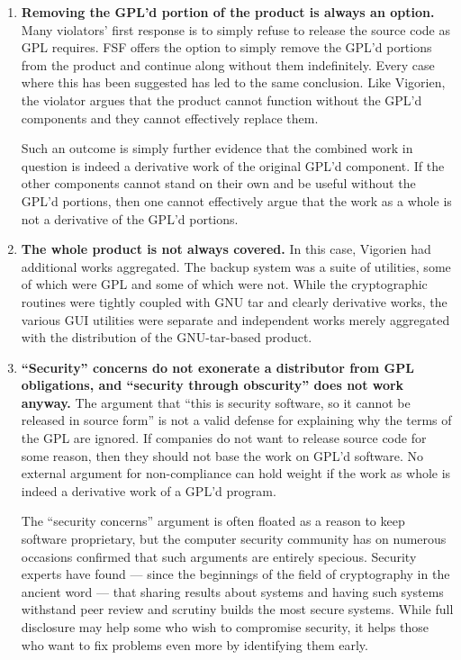 \documentclass[12pt]{report}
\begin{document}
\begin{enumerate}

\item {\bf Removing the GPL'd portion of the product is always an option.}
  Many violators' first response is to simply refuse to release the source
  code as GPL requires.  FSF offers the option to simply remove the GPL'd
  portions from the product and continue along without them indefinitely.
  Every case where this has been suggested has led to the same conclusion.
  Like Vigorien, the violator argues that the product cannot function
  without the GPL'd components and they cannot effectively replace them.

  Such an outcome is simply further evidence that the combined work in
  question is indeed a derivative work of the original GPL'd component.
  If the other components cannot stand on their own and be useful without
  the GPL'd portions, then one cannot effectively argue that the work as a
  whole is not a derivative of the GPL'd portions.

\item {\bf The whole product is not always covered.}  In this case,
  Vigorien had additional works aggregated.  The backup system was a suite
  of utilities, some of which were GPL and some of which were not.  While
  the cryptographic routines were tightly coupled with GNU tar and clearly
  derivative works, the various GUI utilities were separate and
  independent works merely aggregated with the distribution of the
  GNU-tar-based product.


\item {\bf ``Security'' concerns do not exonerate a distributor from GPL
  obligations, and ``security through obscurity'' does not work anyway.}
  The argument that ``this is security software, so it cannot be released
  in source form'' is not a valid defense for explaining why the terms of
  the GPL are ignored.  If companies do not want to release source code
  for some reason, then they should not base the work on GPL'd software.
  No external argument for non-compliance can hold weight if the work as
  whole is indeed a derivative work of a GPL'd program.

  The ``security concerns'' argument is often floated as a reason to keep
  software proprietary, but the computer security community has on
  numerous occasions confirmed that such arguments are entirely specious.
  Security experts have found --- since the beginnings of the field of
  cryptography in the ancient word --- that sharing results about systems
  and having such systems withstand peer review and scrutiny builds the
  most secure systems.  While full disclosure may help some who wish to
  compromise security, it helps those who want to fix problems even more
  by identifying them early.


\end{enumerate}
\end{document}
